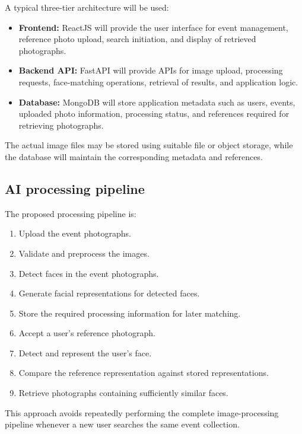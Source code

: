 \documentclass[11pt,a4paper]{article}
\begin{document}
A typical three-tier architecture will be used:

\begin{itemize}[leftmargin=0.7cm]
    \item \textbf{Frontend:} ReactJS will provide the user interface for
    event management, reference photo upload, search initiation, and
    display of retrieved photographs.

    \item \textbf{Backend API:} FastAPI will provide APIs for image
    upload, processing requests, face-matching operations, retrieval of
    results, and application logic.

    \item \textbf{Database:} MongoDB will store application metadata
    such as users, events, uploaded photo information, processing
    status, and references required for retrieving photographs.
\end{itemize}

The actual image files may be stored using suitable file or object
storage, while the database will maintain the corresponding metadata
and references.

\subsection{AI processing pipeline}

The proposed processing pipeline is:

\begin{enumerate}[leftmargin=0.7cm]
    \item Upload the event photographs.
    \item Validate and preprocess the images.
    \item Detect faces in the event photographs.
    \item Generate facial representations for detected faces.
    \item Store the required processing information for later matching.
    \item Accept a user's reference photograph.
    \item Detect and represent the user's face.
    \item Compare the reference representation against stored
    representations.
    \item Retrieve photographs containing sufficiently similar faces.
\end{enumerate}

This approach avoids repeatedly performing the complete image-processing
pipeline whenever a new user searches the same event collection.
\end{document}
